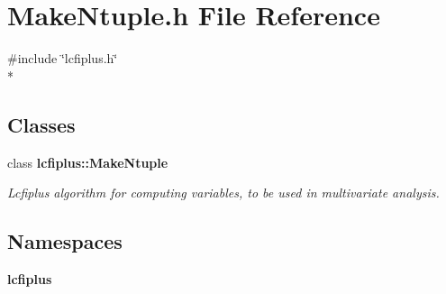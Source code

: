 \section{Make\-Ntuple.\-h File Reference}
\label{MakeNtuple_8h}
{\ttfamily \#include \char`\"{}lcfiplus.\-h\char`\"{}}\\*
\subsection*{Classes}
\begin{DoxyCompactItemize}
\item 
class {\bf lcfiplus\-::\-Make\-Ntuple}
\begin{DoxyCompactList}\small\item\em Lcfiplus algorithm for computing variables, to be used in multivariate analysis. \end{DoxyCompactList}\end{DoxyCompactItemize}
\subsection*{Namespaces}
\begin{DoxyCompactItemize}
\item 
{\bf lcfiplus}
\end{DoxyCompactItemize}
